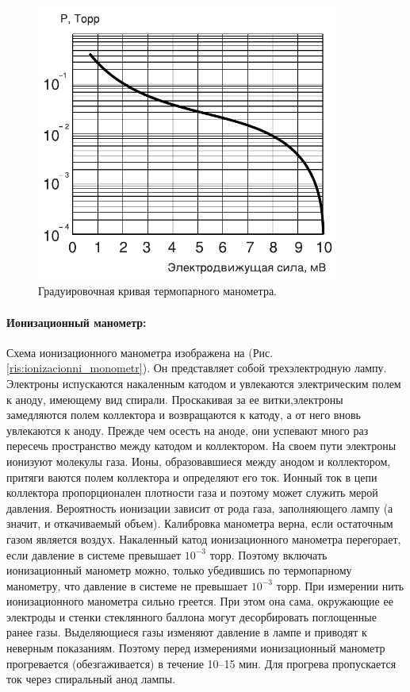 \documentclass[a4paper, 12pt]{article}
\begin{document}
\begin{figure}[h]
\begin{minipage}{0.7\textwidth}
        \centering
        \includegraphics[width=0.9\textwidth]{termopara_graduirovka}
        \caption{Градуировочная кривая термопарного манометра.}
        \label{ris:termopara_graduirovka}
    \end{minipage}
    \end{figure}

    \newpage

    \paragraph{Ионизационный манометр:}
    Схема ионизационного манометра изображена на (Рис. \ref{ris:ionizacionni_monometr}). Он представляет собой трехэлектродную лампу. Электроны испускаются накаленным катодом и увлекаются электрическим полем к аноду, имеющему вид спирали. Проскакивая за ее витки,электроны замедляются полем коллектора и возвращаются к катоду, а от него вновь увлекаются к аноду. Прежде чем осесть на аноде, они успевают много раз пересечь пространство между катодом и коллектором. На своем пути электроны ионизуют молекулы газа. Ионы, образовавшиеся между анодом и коллектором, притяги ваются полем коллектора и определяют его ток. Ионный ток в цепи коллектора пропорционален плотности газа и поэтому может служить мерой давления. Вероятность ионизации зависит от рода газа, заполняющего лампу (а значит, и откачиваемый объем). Калибровка манометра верна, если остаточным газом является воздух. Накаленный катод ионизационного манометра перегорает, если давление в системе превышает $10^{-3}$ торр. Поэтому включать ионизационный манометр можно, только убедившись по термопарному манометру, что давление в системе не превышает $10^{-3}$ торр. При измерении нить ионизационного манометра сильно греется. При этом она сама, окружающие ее электроды и стенки стеклянного баллона могут десорбировать поглощенные ранее газы. Выделяющиеся газы изменяют давление в лампе и приводят к неверным показаниям. Поэтому перед измерениями ионизационный манометр прогревается (обезгаживается) в течение 10–15 мин. Для прогрева пропускается ток через спиральный анод лампы.
\end{document}
